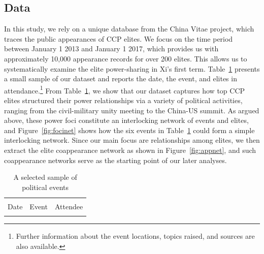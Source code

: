 \documentclass[11pt,english]{article}
\begin{document}
\begin{flushleft}

\section*{Data}

In this study, we rely on a unique database from the China Vitae project, which traces the public appearances of CCP elites. We focus on the time period between January 1 2013 and January 1 2017, which provides us with approximately 10,000 appearance records for over 200 elites. This allows us to systematically examine the elite power-sharing in Xi's first term. Table~\ref{tab:eventDesc} presents a small sample of our dataset and reports the date, the event, and elites in attendance.\footnote{Further information about the event locations, topics raised, and sources are also available.} From Table~\ref{tab:eventDesc}, we show that our dataset captures how top CCP elites structured their power relationships via a variety of political activities, ranging from the civil-military unity meeting to the China-US summit. As argued above, these power foci constitute an interlocking network of events and elites, and Figure~\ref{fig:focinet} shows how the six events in Table~\ref{tab:eventDesc} could form a simple interlocking network. Since our main focus are relationships among elites, we then extract the elite coappearance network as shown in Figure~\ref{fig:appnet}, and such coappearance networks serve as the starting point of our later analyses.

\noindent \begin{center}
\begin{table}[H]
\caption{A selected sample of political events}
\label{tab:eventDesc}
\centering
\small
\begin{tabular}{p{1in}p{3in}p{2in}}
  \\[-1.8ex]\hline
  \hline \\[-1.8ex]
   Date & Event & Attendee \\    \hline \\[-1.8ex]


\end{tabular}
\end{table}
\end{center}
\end{flushleft}
\end{document}
